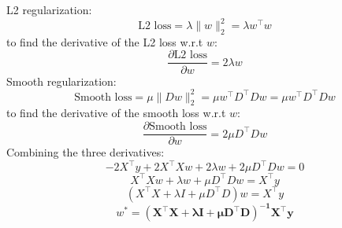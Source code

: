 \documentclass[a3paper,12pt]{extarticle} %
\begin{document}
\begin{enumerate}
\begin{enumerate}
\[        \]
        L2 regularization:
        \[
        \text{L2 loss} = \lambda \|w\|_2^2 = \lambda w^\top w
        \]
        to find the derivative of the L2 loss w.r.t \(w\):
        \[
        \frac{\partial \text{L2 loss}}{\partial w} = 2\lambda w
        \]
        Smooth regularization:
        \[
        \text{Smooth loss} = \mu \|Dw\|_2^2 = \mu w^\top D^\top Dw = \mu w^\top D^\top Dw
        \]
        to find the derivative of the smooth loss w.r.t \(w\):
        \[
        \frac{\partial \text{Smooth loss}}{\partial w} = 2\mu D^\top Dw
        \]
        Combining the three derivatives:
        \[
        -2X^\top y + 2X^\top Xw + 2\lambda w + 2\mu D^\top Dw = 0
        \]
        \[
        X^\top Xw + \lambda w + \mu D^\top Dw = X^\top y
        \]
        \[
        (X^\top X + \lambda I + \mu D^\top D)w = X^\top y
        \]
        \[
        w^* =  \mathbf{(X^\top X + \lambda I + \mu D^\top D)^{-1} X^\top y}
        \]



\end{enumerate}
\end{enumerate}
\end{document}
